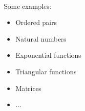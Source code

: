 \documentclass[10pt, t]{beamer}
\newcommand{\nullspace}{~\\[15pt]}
\begin{document}
\begin{frame}[allowframebreaks]
    \nullspace
    Some examples:
    \begin{itemize}
        \item Ordered pairs
        \item Natural numbers
        \item Exponential functions
        \item Triangular functions
        \item Matrices
        \item ...
    \end{itemize}
\end{frame}



    
\end{document}

